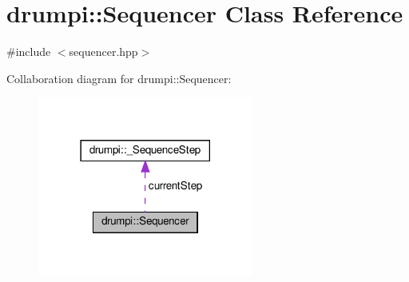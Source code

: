 \hypertarget{classdrumpi_1_1Sequencer}{}\section{drumpi\+:\+:Sequencer Class Reference}
\label{classdrumpi_1_1Sequencer}


{\ttfamily \#include $<$sequencer.\+hpp$>$}



Collaboration diagram for drumpi\+:\+:Sequencer\+:
\nopagebreak
\begin{figure}[H]
\begin{center}
\leavevmode
\includegraphics[width=201pt]{classdrumpi_1_1Sequencer__coll__graph}
\end{center}
\end{figure}
